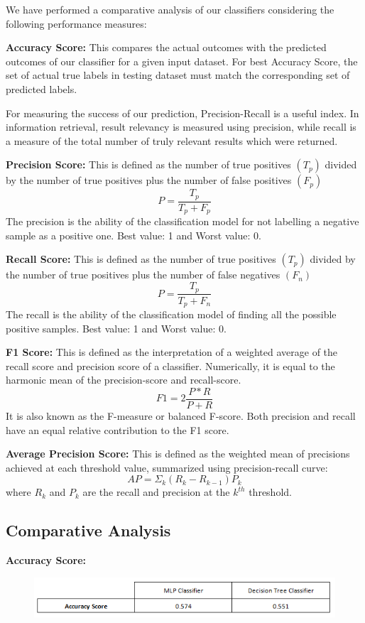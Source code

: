 \documentclass[a4paper, 10pt, conference]{IEEEtran}
\begin{document}
We have performed a comparative analysis of our classifiers considering the following performance measures: 

\textbf{Accuracy Score:}
 This compares the actual outcomes with the predicted outcomes of our classifier for a given input dataset. For best Accuracy Score, the set of actual true labels in testing dataset must match the corresponding set of predicted labels.

For measuring the success of our prediction, Precision-Recall is a useful index. In information retrieval, result relevancy is measured using precision, while recall is a measure of the total number of truly relevant results which were returned.

\textbf{Precision Score:}
This is defined as the number of true positives $(T_{p})$ divided by the number of true positives plus the number of false positives $(F_{p})$
\[ P = \frac{T_{p}}{T_{p}+F_{p}}\]
The precision is the ability of the classification model for not labelling a negative sample as a positive one. Best value: 1 and Worst value: 0. 

\textbf{Recall Score:}
This is defined as the number of true positives $(T_{p})$ divided by the number of true positives plus the number of false negatives $(F_{n})$
\[ P = \frac{T_{p}}{T_{p}+F_{n}}\]
The recall is the ability of the classification model of finding all the possible positive samples. Best value: 1 and Worst value: 0.

\textbf{F1 Score:}
This is defined as the interpretation of a weighted average of the recall score and precision score of a classifier. Numerically, it is equal to the harmonic mean of the precision-score and recall-score.
\[ F1 = 2 \frac{P*R}{P+R}
\]
It is also known as the F-measure or balanced F-score. Both precision and recall have an equal relative contribution to the F1 score.

\textbf{Average Precision Score:}
This is defined as the weighted mean of precisions achieved at each threshold value, summarized using precision-recall curve:
\[ AP = \Sigma_{k}(R_{k}-R_{k-1})P_{k}\]
where \textit{$R_{k}$} and \textit{$P_{k}$} are the recall and precision at the \textit{$k^{th}$} threshold.

\subsection{Comparative Analysis}
\textbf{Accuracy Score:}
\begin{figure}[h!]
  \includegraphics[width=\linewidth]{ModelScore.png}
  \label{fig:scoremodel}
\end{figure}
\end{document}

